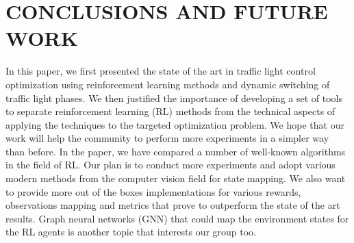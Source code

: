 \documentclass[a4paper,twoside]{article}
\begin{document}
\section{\uppercase{Conclusions and future work}}
\label{sec:conclusion}
In this paper, we first presented the state of the art in traffic light control optimization using reinforcement learning methods and dynamic switching of traffic light phases. We then justified the importance of developing a set of tools to separate reinforcement learning (RL) methods from the technical aspects of applying the techniques to the targeted optimization problem. We hope that our work will help the community to perform more experiments in a simpler way than before. In the paper, we have compared a number of well-known algorithms in the field of RL. Our plan is to conduct more experiments and adopt various modern methods from the computer vision field for state mapping. We also want to provide more out of the boxes implementations for various rewards, observations mapping and metrics that prove to outperform the state of the art results. Graph neural networks (GNN) \cite{deepmindblog} that could map the environment states for the RL agents is another topic that interests our group too.



{\small
}

\end{document}
